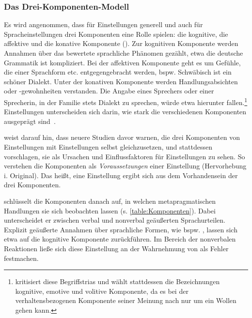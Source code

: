 \subsubsection{Das Drei-Komponenten-Modell}
\label{sec:Komponenten}
Es wird angenommen, dass für Einstellungen generell und auch für Spracheinstellungen drei Komponenten eine Rolle spielen: die kognitive, die affektive und die konative Komponente (\cites[s.][242--244]{Ajzen1989}[221]{Cargile.1994}[200]{Jonas.2014}). 
Zur kognitiven Komponente werden Annahmen über das bewertete sprachliche Phänomen gezählt, etwa \glq die deutsche Grammatik ist kompliziert\grq. 
Bei der affektiven Komponente geht es um Gefühle, die einer Sprachform etc. entgegengebracht werden, bspw. \glq Schwäbisch ist ein schöner Dialekt\grq. 
Unter der konativen Komponente werden Handlungsabsichten oder -gewohnheiten verstanden. Die Angabe eines Sprechers oder einer Sprecherin, in der Familie stets Dialekt zu sprechen, würde etwa hierunter fallen.\footnote{\citet[65--66, 76--77]{Hermanns.2002} kritisiert diese Begriffstrias und w{\"a}hlt stattdessen die Bezeichnungen kognitive, emotive und volitive Komponente, da es bei der verhaltensbezogenen Komponente seiner Meinung nach nur um ein Wollen gehen kann.} Einstellungen unterscheiden sich darin, wie stark die verschiedenen Komponenten ausgeprägt sind~\citep[s.][218]{Aronson.2014}.

\citet[23]{Garrett.2012} weist darauf hin, dass neuere Studien davor warnen, die drei Komponenten von Einstellungen mit Einstellungen selbst gleichzusetzen, und stattdessen vorschlagen, sie als Ursachen und Einflussfaktoren f{\"u}r Einstellungen zu sehen. So verstehen \citet[198]{Jonas.2014} die Komponenten als \glqq \textit{Voraussetzungen} einer Einstellung\grqq{} (Hervorhebung i. Original).  
Das heißt, eine Einstellung ergibt sich aus dem Vorhandensein der drei Komponenten.

\citet{Ajzen1989} schlüsselt die Komponenten danach auf, in welchen metapragmatischen Handlungen sie sich beobachten lassen (s. \autoref{table:Komponenten}). 
Dabei unterscheidet er zwischen verbal und nonverbal geäußerten Sprachurteilen. 
Explizit geäußerte Annahmen über sprachliche Formen, wie bspw. , lassen sich etwa auf die kognitive Komponente zurückführen.
Im Bereich der nonverbalen Reaktionen ließe sich diese Einstellung an der Wahrnehmung von  als Fehler festmachen.

